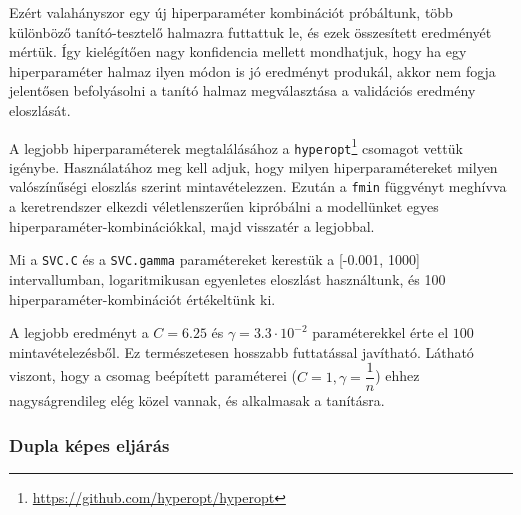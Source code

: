 Ezért valahányszor egy új hiperparaméter kombinációt próbáltunk, több különböző tanító-tesztelő halmazra futtattuk le, és ezek összesített eredményét mértük.
Így kielégítően nagy konfidencia mellett mondhatjuk, hogy ha egy hiperparaméter halmaz ilyen módon is jó eredményt
produkál, akkor nem fogja jelentősen befolyásolni a tanító halmaz megválasztása a validációs 
eredmény eloszlását.

A legjobb hiperparaméterek megtalálásához a \texttt{hyperopt}\footnote{\url{https://github.com/hyperopt/hyperopt}} csomagot vettük
igénybe. Használatához meg kell adjuk, hogy milyen hiperparamétereket milyen valószínűségi eloszlás szerint
mintavételezzen. Ezután a \texttt{fmin} függvényt meghívva a keretrendszer elkezdi véletlenszerűen
kipróbálni a modellünket egyes hiperparaméter-kombinációkkal, majd visszatér a legjobbal. 

Mi a \texttt{SVC.C} és a \texttt{SVC.gamma} paramétereket kerestük a [-0.001, 1000] intervallumban,  logaritmikusan egyenletes eloszlást használtunk, és 100 hiperparaméter-kombinációt értékeltünk ki.
%
%
%
%
%	
%	
%	
%	
%	


A legjobb eredményt a $ C=6.25 $ és $ \gamma = 3.3 \cdot 10^{-2} $ paraméterekkel érte el $ 100 $
mintavételezésből. Ez természetesen hosszabb futtatással javítható. Látható viszont, hogy a csomag
beépített paraméterei ($ C=1 , \gamma =\dfrac{1}{n} $) ehhez nagyságrendileg elég közel vannak,
és alkalmasak a tanításra.



\subsubsection{Dupla képes eljárás}
\label{sec:dupla.kepes.eljaras}

